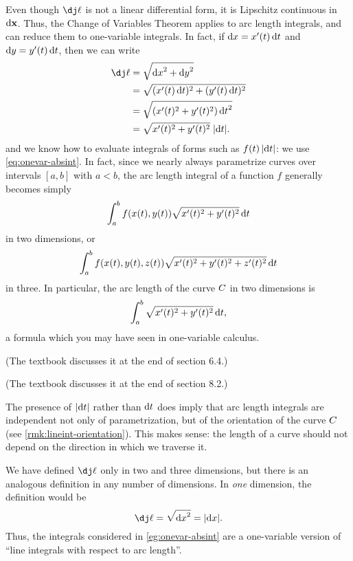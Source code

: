 \documentclass[12pt]{amsart}
\begin{document}
Even though $\dl$ is not a linear differential form, it is Lipschitz continuous in $\dpx$.
Thus, the Change of Variables Theorem applies to arc length integrals, and can reduce them to one-variable integrals.
In fact, if $\dx = x'(t) \,\dt$ and $\dy = y'(t)\,\dt$, then we can write
\begin{align*}
  \dl &= \sqrt{\dx^2+\dy^2}\\
  &= \sqrt{(x'(t)\,\dt)^2 + (y'(t)\,\dt)^2}\\
  &= \sqrt{(x'(t)^2 + y'(t)^2) \,\dt^2}\\
  &= \sqrt{x'(t)^2 + y'(t)^2} \;|\dt|.
\end{align*}
and we know how to evaluate integrals of forms such as $f(t)\,|\dt|$: we use \cref{eq:onevar-absint}.
In fact, since we nearly always parametrize curves over intervals $[a,b]$ with $a<b$, the arc length integral of a function $f$ generally becomes simply
\[ \itint t a b {f(x(t),y(t)) \sqrt{x'(t)^2 + y'(t)^2}} \]
in two dimensions, or
\[ \itint t a b {f(x(t),y(t),z(t)) \sqrt{x'(t)^2 + y'(t)^2+z'(t)^2}} \]
in three.
In particular, the arc length of the curve $\curve$ in two dimensions is
\[ \itint t a b {\sqrt{x'(t)^2 + y'(t)^2}}, \]
a formula which you may have seen in one-variable calculus.
\begin{stewart}(The textbook discusses it at the end of section 6.4.)\end{stewart}
\begin{hugheshallett}(The textbook discusses it at the end of section 8.2.)\end{hugheshallett}


\begin{rmk}
  The presence of $|\dt|$ rather than $\dt$ does imply that arc length integrals are independent not only of parametrization, but of the orientation of the curve $\curve$ (see \cref{rmk:lineint-orientation}).
  This makes sense: the length of a curve should not depend on the direction in which we traverse it.
\end{rmk}

\begin{rmk}
  We have defined $\dl$ only in two and three dimensions, but there is an analogous definition in any number of dimensions.
  In \emph{one} dimension, the definition would be
  \[ \dl = \sqrt{\dx^2} = |\dx|. \]
  Thus, the integrals considered in \cref{eg:onevar-absint} are a one-variable version of ``line integrals with respect to arc length''.
\end{rmk}
\end{document}
